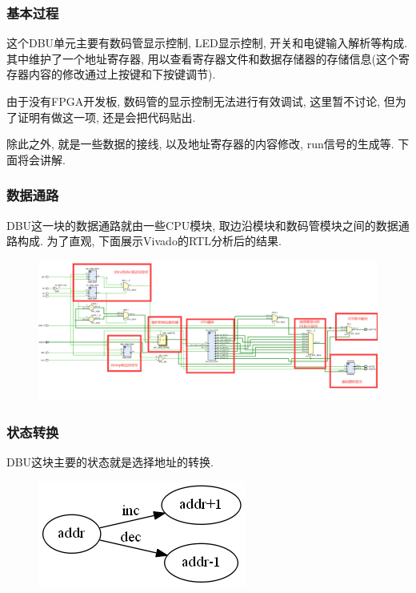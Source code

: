\documentclass[UTF8]{article}
\begin{document}
\subsubsection{基本过程}
这个DBU单元主要有数码管显示控制, LED显示控制, 开关和电键输入解析等构成. 其中维护了一个地址寄存器, 用以查看寄存器文件和数据存储器的存储信息(这个寄存器内容的修改通过上按键和下按键调节).\par
由于没有FPGA开发板, 数码管的显示控制无法进行有效调试, 这里暂不讨论, 但为了证明有做这一项, 还是会把代码贴出.\par
除此之外, 就是一些数据的接线, 以及地址寄存器的内容修改, run信号的生成等. 下面将会讲解.
\subsubsection{数据通路}
DBU这一块的数据通路就由一些CPU模块, 取边沿模块和数码管模块之间的数据通路构成. 为了直观, 下面展示Vivado的RTL分析后的结果.\par
\begin{figure}[H]
	\centering
	\includegraphics[width=\linewidth]{dbu_data_path.png}
\end{figure}
\subsubsection{状态转换}
DBU这块主要的状态就是选择地址的转换.
\begin{figure}[H]
	\centering
	\includegraphics[width=\linewidth/5]{dbu_phase_diagram.png}
\end{figure}
\end{document}
